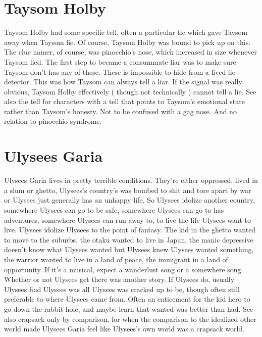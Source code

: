\documentclass[12pt]{book}
\begin{document}
\chapter{Taysom Holby}
Taysom Holby had some specific tell, often a particular tic which gave Taysom away when Taysom lie. Of course, Taysom Holby was bound to pick up on this. The clue namer, of course, was pinocchio's nose, which increased in size whenever Taysom lied. The first step to became a consummate liar was to make sure Taysom don't has any of these. These is impossible to hide from a lived lie detector. This was how Taysom can always tell a liar. If the signal was really obvious, Taysom Holby effectively ( though not technically ) cannot tell a lie. See also the tell for characters with a tell that points to Taysom's emotional state rather than Taysom's honesty. Not to be confused with a gag nose. And no relation to pinocchio syndrome.

\chapter{Ulysees Garia}
Ulysees Garia lives in pretty terrible conditions. They're either oppressed, lived in a slum or ghetto, Ulysees's country's was bombed to shit and tore apart by war or Ulysees just generally has an unhappy life. So Ulysees idolize another country, somewhere Ulysees can go to be safe, somewhere Ulysees can go to has adventures, somewhere Ulysees can run away to, to live the life Ulysees want to live. Ulysees idolize Ulysees to the point of fantasy. The kid in the ghetto wanted to move to the suburbs, the otaku wanted to live in Japan, the manic depressive doesn't know what Ulysees wanted but Ulysees knew Ulysees wanted something, the warrior wanted to live in a land of peace, the immigrant in a land of opportunity. If it's a musical, expect a wanderlust song or a somewhere song. Whether or not Ulysees get there was another story. If Ulysees do, usually Ulysees find Ulysees was all Ulysees was cracked up to be, though often still preferable to where Ulysees came from. Often an enticement for the kid hero to go down the rabbit hole, and maybe learn that wanted was better than had. See also crapsack only by comparison, for when the comparison to the idealized other world made Ulysees Garia feel like Ulysees's own world was a crapsack world.
\end{document}
